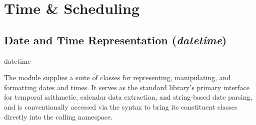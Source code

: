 \documentclass[10pt]{article}
\begin{document}
\section{Time \& Scheduling}

  \subsection{Date and Time Representation (\textit{datetime})}

    \begin{core}{datetime}

      The \href{https://docs.python.org/3/library/datetime.html}{} module supplies a suite of classes for representing, manipulating, and formatting dates and times. It serves as the standard library's primary interface for temporal arithmetic, calendar data extraction, and string-based date parsing, and is conventionally accessed via the  syntax to bring its constituent classes directly into the calling namespace.

    \end{core}
\end{document}
